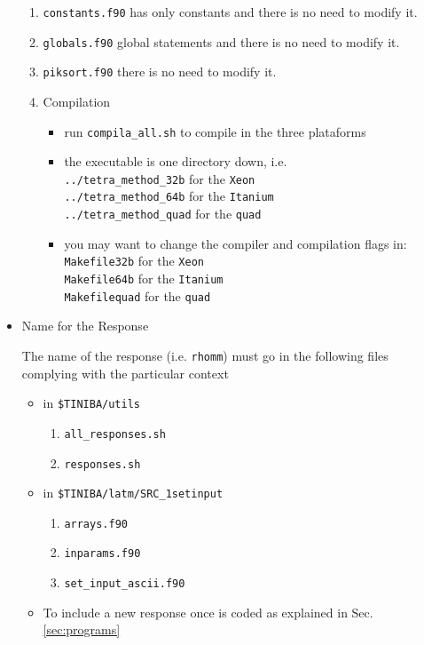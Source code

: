 \documentclass[12pt,leqno]{article}
\numberwithin{equation}{section}
\begin{document}
\begin{itemize}
\begin{enumerate}
\item \verb=constants.f90= has only constants and there is no need to
modify it.
\item \verb=globals.f90= global statements and there is no need to
modify it.
\item \verb=piksort.f90= there is no need to
modify it.
\item Compilation
\begin{itemize}
\item run \verb=compila_all.sh= to compile in the three plataforms
\item the executable is one directory down, i.e.\\
\verb=../tetra_method_32b= for the \verb=Xeon=\\
\verb=../tetra_method_64b= for the \verb=Itanium=\\
\verb=../tetra_method_quad= for the \verb=quad=
\item you may want to change the compiler and compilation flags in:\\
\verb=Makefile32b= for the \verb=Xeon=\\
\verb=Makefile64b= for the \verb=Itanium=\\
\verb=Makefilequad= for the \verb=quad=
\end{itemize}

\end{enumerate}

\item Name for the Response

The name of the response (i.e. \verb=rhomm=)
 must go in the following files complying with the particular context 
\begin{itemize}
\item in \verb=$TINIBA/utils=
\begin{enumerate}
\item \verb=all_responses.sh=
\item \verb=responses.sh=
\end{enumerate}
\item in \verb=$TINIBA/latm/SRC_1setinput=
\begin{enumerate}
\item \verb=arrays.f90=
\item \verb=inparams.f90=
\item \verb=set_input_ascii.f90=
\end{enumerate}
\item To include a new response once is coded as explained in
 Sec. \ref{sec:programs} 


\end{itemize}
\end{itemize}
\end{document}
